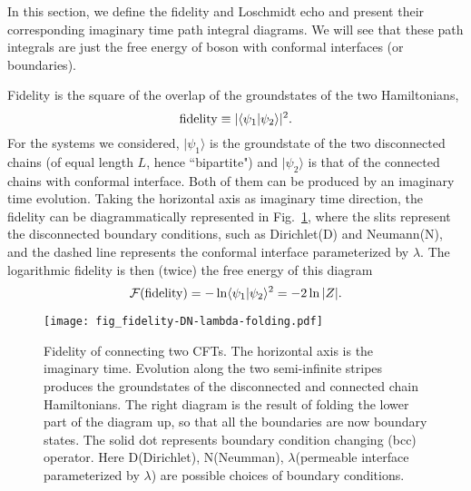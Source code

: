 
In this section, we define the fidelity and Loschmidt echo and present their corresponding imaginary time path integral diagrams.  We will see that these path integrals are just the free energy of boson with conformal interfaces (or boundaries). 

Fidelity is the square of the overlap of the groundstates of the two Hamiltonians, 
\begin{equation}
{\rm fidelity} \equiv |\langle \psi_1 |\psi_2  \rangle |^2 .
\end{equation}
For the systems we considered, $|\psi_1 \rangle$ is the groundstate of the two disconnected chains (of equal length $L$, hence ``bipartite") and $|\psi_2\rangle$ is that of the connected chains with conformal interface. Both of them can be produced by an imaginary time evolution. Taking the horizontal axis as imaginary time direction, the fidelity can be diagrammatically represented in Fig.~\ref{fig:fidel}, where the slits represent the disconnected boundary conditions, such as Dirichlet(D) and Neumann(N), and the dashed line represents the conformal interface parameterized by $\lambda$. The logarithmic fidelity is then (twice) the free energy of this diagram
\begin{equation}
\mathcal{F}( {\rm fidelity} )  = - \ln \langle \psi_1 |\psi_2 \rangle^2 = - 2 \ln |Z|.
\end{equation}

\begin{figure}[h]
\texttt{[image: fig\_fidelity-DN-lambda-folding.pdf]}
\caption{Fidelity of connecting two CFTs. The horizontal axis is the imaginary time. Evolution along the two semi-infinite stripes produces the groundstates of the disconnected and connected chain Hamiltonians. The right diagram is the result of folding the lower part of the diagram up, so that all the boundaries are now boundary states. The solid dot represents boundary condition changing (bcc) operator. Here D(Dirichlet), N(Neumman), $\lambda$(permeable interface parameterized by $\lambda$) are possible choices of boundary conditions.}
\label{fig:fidel}
\end{figure}

